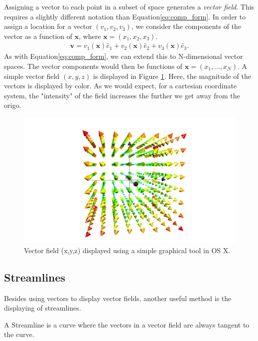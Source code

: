 \documentclass[main.tex]{subfiles}
\begin{document}
Assigning a vector to each point in a subset of space generates a \emph{vector field}. This 
requires a slightly different notation than Equation\eqref{eq:comp_form}. In order to assign 
a location for a vector $(v_1,v_2,v_3)$, we consider the components of the vector as a function 
of $\mathbf{x}$, where $\mathbf{x} = (x_1,x_2,x_3)$.
\begin{align*}
\mathbf{v} = v_1(\mathbf{x})\hat{e}_1 + v_2(\mathbf{x})\hat{e}_2 + v_3(\mathbf{x})\hat{e}_3.
\end{align*}
As with Equation\eqref{eq:comp_form}, we can extend this to N-dimensional vector spaces.
The vector components would then be functions of $\mathbf{x} = (x_1,\hdots,x_N)$. A simple 
vector field $(x,y,z)$ is displayed in Figure \ref{fig:vector_field_xyz}. Here, the magnitude of the 
vectors is displayed by color. As we would expect, for a cartesian coordinate system, the "intensity" 
of the field increases the further we get away from the origo.

\begin{figure}
\hspace{5mm}\includegraphics[scale=0.5,natwidth=29.11,natheight=17.33]{../figures/velocity_field_xyz.pdf} 
\caption{Vector field (x,y,z) displayed using a simple graphical tool in OS X.}
\label{fig:vector_field_xyz}
\end{figure}


\subsection{Streamlines}
Besides using vectors to display vector fields, another useful method is the displaying of streamlines.
\begin{mydef}
A Streamline is a curve where the vectors in a vector field are always tangent to the curve.
\end{mydef}
\end{document}
